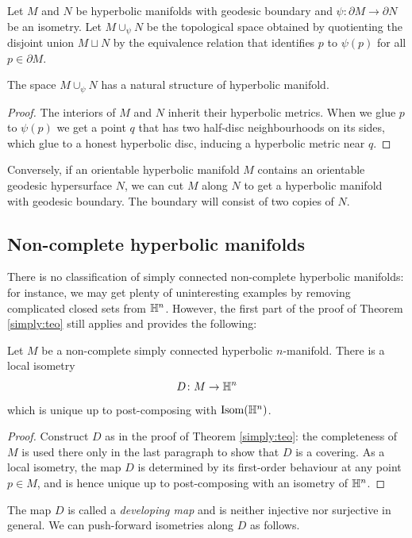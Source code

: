 Let $M$ and $N$ be hyperbolic manifolds with geodesic boundary and $\psi\colon \partial M \to \partial N$ be an isometry. Let $M\cup_\psi N$ be the topological space obtained by quotienting the disjoint union $M\sqcup N$ by the equivalence relation that identifies $p$ to $\psi(p)$ for all $p\in \partial M$.

\begin{prop} \label{geodesic:glue:prop}
The space $M\cup_\psi N$ has a natural structure of hyperbolic manifold.
\end{prop}
\begin{proof}
The interiors of $M$ and $N$ inherit their hyperbolic metrics. When we glue $p$ to $\psi(p)$ we get a point $q$ that has two half-disc neighbourhoods on its sides, which glue to a honest hyperbolic disc, inducing a hyperbolic metric near $q$.
\end{proof}

Conversely, if an orientable hyperbolic manifold $M$ contains an orientable geodesic hypersurface $N$, we can cut $M$ along $N$ to get a hyperbolic manifold with geodesic boundary. The boundary will consist of two copies of $N$.

\subsection{Non-complete hyperbolic manifolds} \label{non-complete:subsection}
There is no classification of simply connected non-complete hyperbolic manifolds: for instance, we may get plenty of uninteresting examples by removing complicated closed sets from $\mathbb{H}^n$. However, the first part of the proof of Theorem \ref{simply:teo} still applies and provides the following:

\begin{prop}
Let $M$ be a non-complete simply connected hyperbolic $n$-manifold. There is a local isometry
$$D\colon M \to \mathbb{H}^n$$
which is unique up to post-composing with ${\rm Isom}(\mathbb{H}^n)$.
\end{prop}
\begin{proof}
Construct $D$ as in the proof of Theorem \ref{simply:teo}: the completeness of $M$ is used there only in the last paragraph to show that $D$ is a covering.
As a local isometry, the map $D$ is determined by its first-order behaviour at any point $p\in M$, and is hence unique up to post-composing with an isometry of $\mathbb{H}^n$.
\end{proof}

The map $D$ is called a \emph{developing map} and is neither injective nor surjective in general. We can push-forward isometries along $D$ as follows. 

